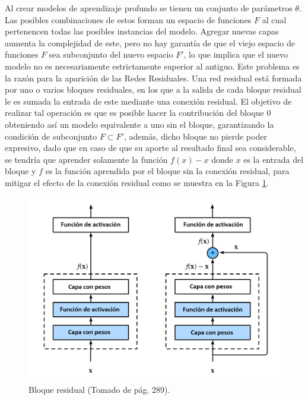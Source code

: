 Al crear modelos de aprendizaje profundo se tienen un conjunto de parámetros $\theta$. Las posibles combinaciones 
de estos forman un espacio de funciones $F$ al cual pertenencen todas las posibles instancias del modelo.
Agregar nuevas capas aumenta la complejidad de este, pero no hay garantía de que el viejo espacio 
de funciones $F$ sea subconjunto del nuevo espacio $F'$, lo que implica que el nuevo modelo no es necesariamente
estrictamente superior al antiguo. Este problema es la razón para la aparición de las Redes Residuales. 
Una red residual está formada por 
uno o varios bloques residuales, en los que a la salida de cada bloque residual le es sumada la entrada de 
este mediante una conexión residual.
El objetivo de realizar tal operación es que es posible hacer la contribución del bloque 0 obteniendo así
un modelo equivalente a uno sin el bloque, garantizando la condición de subconjunto $F \subset F'$, además,
dicho bloque no pierde poder expresivo, dado que en caso de que su aporte al resultado final sea considerable, 
se tendría que aprender solamente la función $f(x) - x$ donde $x$ es la entrada del bloque y $f$ es la función 
aprendida por el bloque sin la conexión residual, para mitigar el efecto de la conexión residual como se muestra
en la Figura \ref{fig:res_block}.

\begin{figure}[h!]
	\begin{center}
		\begin{center}
			\includegraphics[scale=.4]{Graphics/resnet.png}
        \end{center}
	    \caption{Bloque residual (Tomado de \textcite{d2l} pág. 289).}\label{fig:res_block}
	\end{center}
\end{figure}

